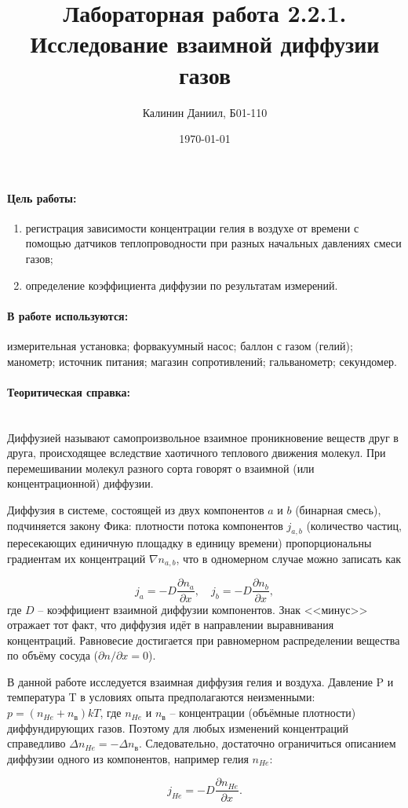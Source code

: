 \documentclass[a4paper, 12pt]{article}
\author{Калинин Даниил, Б01-110}
\date{\today}
\title{Лабораторная работа 2.2.1. Исследование взаимной диффузии газов}
\newcommand{\parag}[1]{\paragraph*{#1:}}
\begin{document}
\maketitle

\parag {Цель работы}

\begin{enumerate}
	\item регистрация зависимости концентрации гелия в воздухе от времени с помощью датчиков теплопроводности при разных начальных давлениях смеси газов;
	\item определение коэффициента диффузии по результатам измерений.
\end{enumerate}

\parag {В работе используются}
измерительная установка; форвакуумный насос; баллон с газом (гелий); манометр; источник питания; магазин сопротивлений; гальванометр; секундомер.

\parag {Теоритическая справка} ~\\
Диффузией называют самопроизвольное взаимное проникновение веществ друг в друга, происходящее вследствие хаотичного теплового движения молекул. При перемешивании молекул разного сорта говорят о взаимной (или концентрационной) диффузии.

Диффузия в системе, состоящей из двух компонентов $ a $ и $ b $ (бинарная смесь), подчиняется закону Фика: плотности потока компонентов $ j_{a,b} $ (количество частиц, пересекающих единичную площадку в единицу времени) пропорциональны градиентам их концентраций $ \nabla n_{a,b}$, что в одномерном случае можно записать как

\[ j_a = -D\frac{\partial n_a}{\partial x}, \quad j_b = -D\frac{\partial n_b}{\partial x}, \]
где $ D $ -- коэффициент взаимной диффузии компонентов. Знак <<минус>> отражает тот факт, что диффузия идёт в направлении выравнивания концентраций. Равновесие достигается при равномерном распределении вещества по объёму сосуда ($ \partial n / \partial x = 0 $).

В данной работе исследуется взаимная диффузия гелия и воздуха. Давление P и температура T в условиях опыта предполагаются неизменными: $ p=(n_{He}+n_{\text{в}})kT $, где $ n_{He} $ и $ n_{\text{в}} $ -- концентрации (объёмные плотности) диффундирующих газов. Поэтому для любых изменений концентраций справедливо $ \Delta n_{He}=-\Delta n_{\text{в}} $. Следовательно, достаточно ограничиться описанием диффузии одного из компонентов, например гелия $ n_{He} $:

\begin{equation}\label{1}
j_{He}=-D\frac{\partial n_{He}}{\partial x}.
\end{equation}
\end{document}
